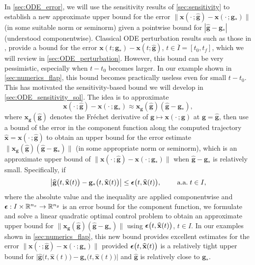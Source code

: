 \documentclass[onefignum,onetabnum]{siamart220329}
\numberwithin{equation}{section}
\newcommand{\aall}{\mbox{ a.a.} \;}
\newcommand {\real} {\mathbb{R}}
\newcommand{\bg}{\ensuremath{\mathbf{g}}} %
\newcommand{\bx}{\ensuremath{\mathbf{x}}} %
\newcommand {\bepsilon} {\mbox{\boldmath $\epsilon$}}
\begin{document}
In \cref{sec:ODE_error}, we will use the sensitivity results of \cref{sec:sensitivity} to establish a new approximate upper bound for the error
 $\| \bx(\cdot \, ; \widehat{\bg}) -  \bx(\cdot \, ; \bg_*) \|$ (in some suitable norm or seminorm) given a pointwise bound for $| \widehat{\bg} -  \bg_* |$ (understood componentwise).
Classical ODE perturbation results such as those in 
\cite[Sec.~I.10]{EHairer_SONorsett_GWanner_1993a}, \cite{GSoderlind_2006a} provide 
a bound for the error $\bx(t; \bg_*) -  \bx(t; \widehat{\bg})$, $t \in \overline{I} = [t_0, t_f]$, which we will review 
in \cref{sec:ODE_perturbation}. However, this bound can be very pessimistic, especially
when $t - t_0$ becomes larger. In our example shown in \cref{sec:numerics_flap}, this
bound becomes practically useless even for small $t - t_0$. This has motivated the sensitivity-based bound
we will develop in \cref{sec:ODE_sensitivity_sol}. The idea is to approximate 
\[
        \bx(\cdot \, ; \widehat{\bg}) - \bx(\cdot \, ;  \bg_*) \approx \bx_\bg(\widehat{\bg})  (\widehat{\bg} - \bg_*),
\] 
where $\bx_\bg(\widehat{\bg})$ denotes the Fr\'echet derivative of $\bg \mapsto \bx(\cdot \, ; \bg)$ at $\bg = \widehat{\bg}$,
then use a bound of the error in the component function along the
computed trajectory $\widehat{\bx} = \bx(\cdot \, ; \widehat{\bg})$ to obtain an upper bound for the error estimate $\| \bx_\bg(\widehat{\bg})  (\widehat{\bg} - \bg_*) \|$ (in some appropriate norm or seminorm), which is an approximate upper bound of $\| \bx(\cdot \, ; \widehat{\bg}) - \bx(\cdot \, ; \bg_*) \|$ when $\widehat{\bg} - \bg_*$ is relatively small.
Specifically, if  $$\big|  \widehat{\bg}\big( t, \widehat{\bx}(t) \big) - \bg_*\big( t, \widehat{\bx}(t) \big) \big| \leq  \bepsilon\big(t, \widehat{\bx}(t)\big), \qquad \aall t \in I,$$ where the absolute value and the inequality are applied componentwise  and $\bepsilon: I \times  \real^{n_x} \rightarrow \real^{n_g}$ is an error bound for the component function, we formulate and solve a linear quadratic optimal control
problem to obtain an approximate upper bound for $\| \bx_\bg(\widehat{\bg})  (\widehat{\bg} - \bg_*)\|$ using $\bepsilon\big(t, \widehat{\bx}(t)\big)$, $t \in I$.
In our examples shown in \cref{sec:numerics_flap}, this new bound provides excellent estimates for the error
$\| \bx(\cdot \, ; \widehat{\bg}) - \bx(\cdot \, ; \bg_*) \|$ provided $\bepsilon\big(t, \widehat{\bx}(t)\big)$ is a relatively tight upper bound 
for $\big|  \widehat{\bg}\big( t, \widehat{\bx}(t) \big) - \bg_*\big( t, \widehat{\bx}(t) \big) \big|$ and $\widehat{\bg}$ is relatively close to $\bg_*$.
\end{document}
